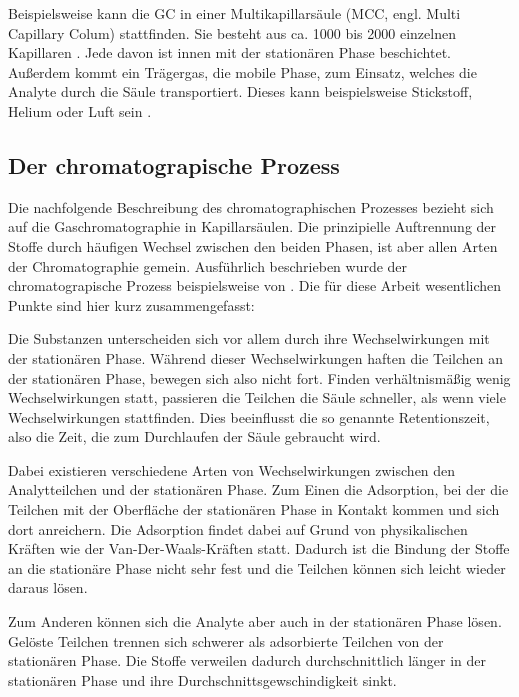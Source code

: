 Beispielsweise kann die GC in einer Multikapillarsäule (MCC, engl. Multi Capillary Colum) stattfinden. Sie besteht aus ca. 1000 bis 2000 einzelnen Kapillaren \citep{obinski1999, Baumbach2009}. Jede davon ist innen mit der stationären Phase beschichtet. Außerdem kommt ein Trägergas, die mobile Phase, zum Einsatz, welches die Analyte durch die Säule transportiert. Dieses kann beispielsweise Stickstoff, Helium \citep{obinski1999} oder Luft sein \citep{Baumbach2009}.

\subsection{Der chromatograpische Prozess}
Die nachfolgende Beschreibung des chromatographischen Prozesses bezieht sich auf die Gaschromatographie in Kapillarsäulen. Die prinzipielle Auftrennung der Stoffe durch häufigen Wechsel zwischen den beiden Phasen, ist aber allen Arten der Chromatographie gemein.
Ausführlich beschrieben wurde der chromatograpische Prozess beispielsweise von \cite {kolb2003}.
Die für diese Arbeit wesentlichen Punkte sind hier kurz zusammengefasst:

Die Substanzen unterscheiden sich vor allem durch ihre Wechselwirkungen mit der stationären Phase. Während dieser Wechselwirkungen haften die Teilchen an der stationären Phase, bewegen sich also nicht fort. Finden verhältnismäßig wenig Wechselwirkungen statt, passieren die Teilchen die Säule schneller, als wenn viele Wechselwirkungen stattfinden. Dies beeinflusst die so genannte Retentionszeit, also die Zeit, die zum Durchlaufen der Säule gebraucht wird.

Dabei existieren verschiedene Arten von Wechselwirkungen zwischen den Analytteilchen und der stationären Phase. Zum Einen die Adsorption, bei der die Teilchen mit der Oberfläche der stationären Phase in Kontakt kommen und sich dort anreichern. Die Adsorption findet dabei auf Grund von physikalischen Kräften wie der Van-Der-Waals-Kräften statt. Dadurch ist die Bindung der Stoffe an die stationäre Phase nicht sehr fest und die Teilchen können sich leicht wieder daraus lösen.

Zum Anderen können sich die Analyte aber auch in der stationären Phase lösen. Gelöste Teilchen trennen sich schwerer als adsorbierte Teilchen von der stationären Phase. Die Stoffe verweilen dadurch durchschnittlich länger in der stationären Phase und ihre Durchschnittsgewschindigkeit sinkt.

